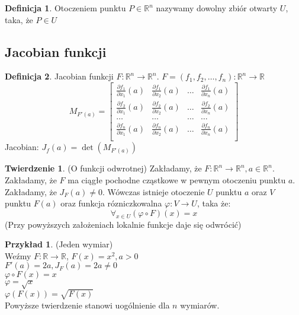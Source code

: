 \documentclass{article}
\theoremstyle{definition}
\newtheorem{de}{Definicja}[subsection]
\theoremstyle{definition}
\newtheorem{tw}{Twierdzenie}[subsection]
\theoremstyle{definition}
\newtheorem{pk}{Przykład}[subsection]
\theoremstyle{definition}
\begin{document}
\begin{de}
    Otoczeniem punktu $P\in\mathbb{R}^n$ nazywamy dowolny zbiór otwarty $U$, taka, że $P\in U$
\end{de}

\subsection{Jacobian funkcji}

\begin{de}
    Jacobian funkcji $F: \mathbb{R}^n \rightarrow \mathbb{R}^n$. $F=(f_1,f_2,\dots,f_n): \mathbb{R}^n\rightarrow\mathbb{R}$
    \[M_{F'(a)} = \begin{bmatrix}
        \frac{\partial f_1}{\partial x_1} (a) & \frac{\partial f_1}{\partial x_2} (a) & \dots & \frac{\partial f_1}{\partial x_n} (a) \\
        \frac{\partial f_2}{\partial x_1} (a) & \frac{\partial f_2}{\partial x_2} (a) & \dots & \frac{\partial f_2}{\partial x_n} (a) \\
        \dots & \dots & \dots & \dots \\
        \frac{\partial f_n}{\partial x_1} (a) & \frac{\partial f_n}{\partial x_2} (a) & \dots & \frac{\partial f_n}{\partial x_n} (a) \\
        \end{bmatrix}\]
    Jacobian: $J_f (a) = \det (M_{F'(a)})$
\end{de}

\begin{tw}
    (O funkcji odwrotnej)
    Zakładamy, że $F: \mathbb{R}^n\rightarrow \mathbb{R}^n, a\in \mathbb{R}^n$.
    Zakładamy, że $F$ ma ciągłe pochodne cząstkowe w pewnym otoczeniu punktu $a$.
    Zakładamy, że $J_{F}(a)\neq 0$.
    Wówczas istnieje otoczenie $U$ punktu $a$ oraz $V$ punktu $F(a)$ oraz funkcja rózniczkowalna $\varphi: V\rightarrow U$, taka że:
    \[\forall_{x\in U} (\varphi \circ F) (x) = x\]
    (Przy powyższych założeniach lokalnie funkcje daje się odwrócić)
\end{tw}

\begin{pk}
    (Jeden wymiar) \\
    Weźmy $F:\mathbb{R} \rightarrow \mathbb{R}$, $F(x)=x^2, a>0$\\
    $F'(a) = 2a, J_F(a)=2a\neq 0$\\
    $\varphi \circ F(x) = x$\\
    $\varphi = \sqrt{x}$\\
    $\varphi\left(F(x)\right)=\sqrt{F(x)}$\\
    Powyższe twierdzenie stanowi uogólnienie dla $n$ wymiarów.
\end{pk}
\end{document}
